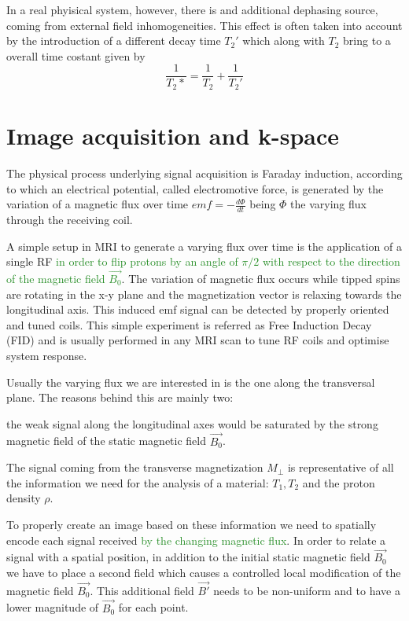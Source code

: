 \documentclass[11pt]{report}
\begin{document}
In a real phyisical system, however, there is and additional dephasing source, coming from external field inhomogeneities.
This effect is often taken into account by the introduction of a different decay time $T_2'$ which along with $T_2$ bring to a overall time costant given by
\begin{equation}
\frac{1}{T_2*} = \frac{1}{T_2}+\frac{1}{T_2'}
\end{equation}


\section{Image acquisition and k-space}

The physical process underlying signal acquisition is Faraday induction, according to which an electrical potential, called electromotive force, is generated by the variation of a magnetic flux over time $emf = -\frac{d\Phi}{dt}$ being $\Phi$ the varying flux through the receiving coil.

A simple setup in MRI to generate a varying flux over time is the application of a single RF \textcolor{ForestGreen}{in order to flip protons by an angle of $\pi/2$ with respect to the direction of the magnetic field $\vec{B_0}$}.
The variation of magnetic flux occurs while tipped spins are rotating in the x-y plane and the magnetization vector is relaxing towards the longitudinal axis.
This induced emf signal can be detected by properly oriented and tuned coils.
This simple experiment is referred as Free Induction Decay (FID) and is usually performed in any MRI scan to tune RF coils and optimise system response.

Usually the varying flux we are interested in is the one along the transversal plane.
The reasons behind this are mainly two:
\begin{enumerate*}
\item the weak signal along the longitudinal axes would be saturated by the strong magnetic field of the static magnetic field $ \vec{B_0}$.
\item The signal coming from the transverse magnetization $M_\perp$ is representative of all the information we need for the analysis of a material: $T_1, T_2$ and the proton density $\rho$.
\end{enumerate*}

\hfill

To properly create an image based on these information we need to spatially encode each signal received \textcolor{ForestGreen}{by the changing magnetic flux}.
In order to relate a signal with a spatial position, in addition to the initial static magnetic field $\vec{B_0}$ we have to place a second field which causes a controlled local modification of the magnetic field $\vec{B_0}$. This additional field $\vec{B'}$ needs to be non-uniform and to have a lower magnitude of $\vec{B_0}$ for each point.
\end{document}
